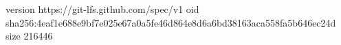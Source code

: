 version https://git-lfs.github.com/spec/v1
oid sha256:4eaf1e688e9bf7e025e67a0a5fe46d864e8d6a6bd38163aca558fa5b646ec24d
size 216446
